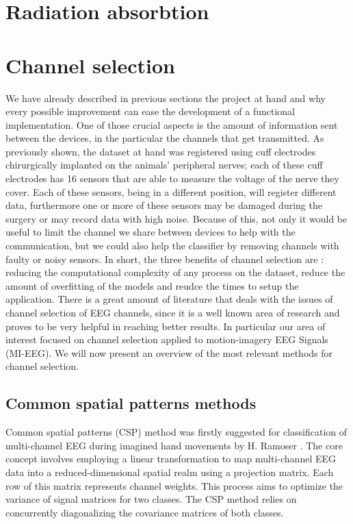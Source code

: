 \documentclass{Configuration_Files/PoliMi3i_thesis}
\begin{document}
\section{Radiation absorbtion}
\section{Channel selection}

We have already described in previous sections the project at hand and why every possible improvement can ease the development of a functional implementation.
One of those crucial aspects is the amount of information sent between the devices, in the particular the channels that get transmitted.
As previously shown, the dataset at hand was registered using cuff electrodes chirurgically implanted on the animals' peripheral nerves; each of these cuff electrodes has 16 sensors that are able to measure the voltage of the nerve they cover.
Each of these sensors, being in a different position, will register different data, furthermore one or more of these sensors may be damaged during the surgery or may record data with high noise.
Because of this, not only it would be useful to limit the channel we share between devices to help with the communication, but we could also help the classifier by removing channels with faulty or noisy sensors.
In short, the three benefits of channel selection are : reducing the computational complexity of any process on the dataset, reduce the amount of overfitting of the models and reudce the times to setup the application. \cite{alotaibyReviewChannelSelection2015}
There is a great amount of literature that deals with the issues of channel selection of EEG channels, since it is a well known area of research and proves to be very helpful in reaching better results.
In particular our area of interest focused on channel selection applied to motion-imagery EEG Signals (MI-EEG).
We will now present an overview of the most relevant methods for channel selection.

\subsection{Common spatial patterns methods}

Common spatial patterns (CSP) method was firstly suggested for classification of multi-channel EEG during imagined hand movements by H. Ramoser \cite{ramoserOptimalSpatialFiltering2000}. The core concept involves employing a linear transformation to map multi-channel EEG data into a reduced-dimensional spatial realm using a projection matrix. Each row of this matrix represents channel weights. This process aims to optimize the variance of signal matrices for two classes. The CSP method relies on concurrently diagonalizing the covariance matrices of both classes. \cite{abdullahEEGChannelSelection2022}
\end{document}

